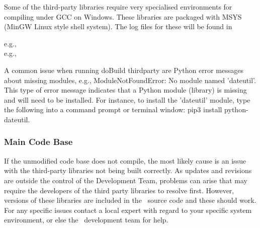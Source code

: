 Some of the third-party libraries require very specialised environments for compiling under GCC on Windows. These libraries are packaged with MSYS (MinGW Linux style shell system). The log files for these will be found in 

e.g., \\
e.g., 

A common issue when running doBuild thirdparty are Python error messages about missing modules, e.g., ModuleNotFoundError: No module named 'dateutil'. This type of error message indicates that a Python module (library) is missing and will need to be installed. For instance, to install the 'dateutil' module, type the following into a command prompt or terminal window: pip3 install python-dateutil.  

\subsubsection{Main Code Base}

If the unmodified code base does not compile, the most likely cause is an issue with the third-party libraries not being built correctly. As updates and revisions are outside the control of the Development Team, problems can arise that may require the developers of the third party libraries to resolve first. However, versions of these libraries are included in the \CNAME\ source code and these should work. For any specific issues contact a local expert with regard to your specific system environment, or else the \CNAME\ development team for help.




